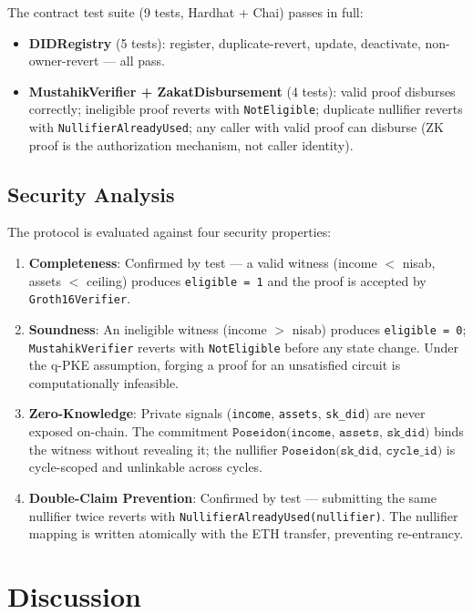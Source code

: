 \documentclass[conference]{IEEEtran}
\begin{document}
The contract test suite (9 tests, Hardhat + Chai) passes in full:

\begin{itemize}
    \item \textbf{DIDRegistry} (5 tests): register, duplicate-revert, update, deactivate, non-owner-revert — all pass.
    \item \textbf{MustahikVerifier + ZakatDisbursement} (4 tests): valid proof disburses correctly; ineligible proof reverts with \texttt{NotEligible}; duplicate nullifier reverts with \texttt{NullifierAlreadyUsed}; any caller with valid proof can disburse (ZK proof is the authorization mechanism, not caller identity).
\end{itemize}

\subsection{Security Analysis}

The protocol is evaluated against four security properties:

\begin{enumerate}
    \item \textbf{Completeness}: Confirmed by test — a valid witness (income $<$ nisab, assets $<$ ceiling) produces \texttt{eligible = 1} and the proof is accepted by \texttt{Groth16Verifier}.
    \item \textbf{Soundness}: An ineligible witness (income $>$ nisab) produces \texttt{eligible = 0}; \texttt{MustahikVerifier} reverts with \texttt{NotEligible} before any state change. Under the q-PKE assumption, forging a proof for an unsatisfied circuit is computationally infeasible.
    \item \textbf{Zero-Knowledge}: Private signals (\texttt{income}, \texttt{assets}, \texttt{sk\_did}) are never exposed on-chain. The commitment $\texttt{Poseidon(income, assets, sk\_did)}$ binds the witness without revealing it; the nullifier $\texttt{Poseidon(sk\_did, cycle\_id)}$ is cycle-scoped and unlinkable across cycles.
    \item \textbf{Double-Claim Prevention}: Confirmed by test — submitting the same nullifier twice reverts with \texttt{NullifierAlreadyUsed(nullifier)}. The nullifier mapping is written atomically with the ETH transfer, preventing re-entrancy.
\end{enumerate}

\section{Discussion}
\end{document}
